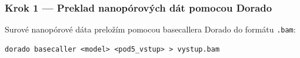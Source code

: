 \subsubsection*{Krok 1 — Preklad nanopórových dát pomocou Dorado}
Surové nanopórové dáta preložím pomocou basecallera Dorado do formátu \texttt{.bam}:
\begin{verbatim}
dorado basecaller <model> <pod5_vstup> > vystup.bam
\end{verbatim}
